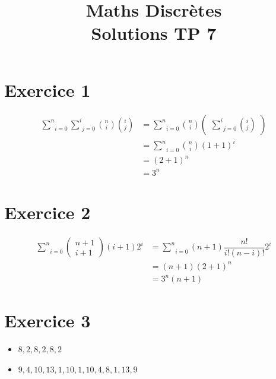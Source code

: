 \documentclass{article}
\title{\textbf{Maths Discrètes}\\ Solutions TP 7}
\date{}
\begin{document}
\maketitle %


\section*{Exercice 1}
\begin{align*}
\underset{i=0}{\overset{n}{\sum}}\underset{j=0}{\overset{i}{\sum}}\binom{n}{i}\binom{i}{j} &=
\underset{i=0}{\overset{n}{\sum}}\binom{n}{i}
\begin{pmatrix}
\underset{j=0}{\overset{i}{\sum}}\binom{i}{j}
\end{pmatrix} \\ &=
\underset{i=0}{\overset{n}{\sum}}\binom{n}{i} (1+1)^{i} \\&=
(2+1)^{n} \\ &=
3^{n}
\end{align*}

\section*{Exercice 2}
\begin{align*}
\underset{i=0}{\overset{n}{\sum}}
\begin{pmatrix}
n+1 \\
i+1
\end{pmatrix}
(i+1)2^{i} &=
\underset{i=0}{\overset{n}{\sum}}(n+1)\dfrac{n!}{i!(n-i)!}2^{i} \\ &=
(n+1)(2+1)^{n} \\ &=
3^{n}(n+1)
\end{align*}

\section*{Exercice 3}
\begin{itemize}
\item $8, 2, 8, 2, 8, 2$ 
\item $9, 4, 10, 13, 1, 10, 1, 10, 4, 8, 1, 13, 9$
\end{itemize}
\end{document}
